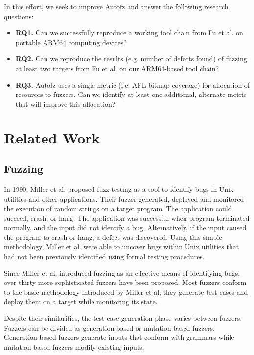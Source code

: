 In this effort, we seek to improve Autofz and answer the following research questions:
\begin{itemize}
    \item \textbf{RQ1.} Can we successfully reproduce a working tool chain from
    Fu et al. \cite{Fu} on portable ARM64 computing devices?
    \item \textbf{RQ2.} Can we reproduce the results (e.g. number of defects found)
     of fuzzing at least two targets from Fu et al. \cite{Fu} on our ARM64-based
      tool chain?
    \item \textbf{RQ3.} Autofz uses a single metric (i.e. AFL bitmap coverage) for
     allocation of resources to fuzzers. Can we identify at least one additional,
     alternate metric that will improve this allocation?
\end{itemize}

\section{Related Work}

\subsection{Fuzzing}
In 1990, Miller et al. proposed fuzz testing as a tool to identify bugs in Unix utilities and other 
applications. Their fuzzer generated, deployed and monitored the execution of random strings on a 
target program. The application could succeed, crash, or hang. The application was successful when 
program terminated normally, and the input did not identify a bug. Alternatively, if the input caused 
the program to crash or hang, a defect was discovered. Using this simple methodology, Miller et al. 
were able to uncover bugs within Unix utilities that had not been previously identified using formal 
testing procedures. \cite{Miller}

Since Miller et al. introduced fuzzing as an effective means of identifying bugs, over thirty more 
sophisticated fuzzers have been proposed. Most fuzzers conform to the basic methodology introduced by 
Miller et al; they generate test cases and deploy them on a target while monitoring its state. 

Despite their similarities, the test case generation phase varies between fuzzers. Fuzzers can be 
divided as generation-based or mutation-based fuzzers. Generation-based fuzzers generate inputs that 
conform with grammars while mutation-based fuzzers modify existing inputs. 

